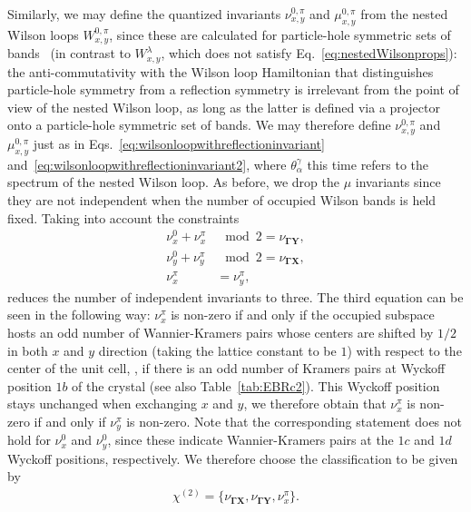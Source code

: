 Similarly, we may define the quantized invariants $\nu_{x,y}^{0,\pi}$ and $\mu_{x,y}^{0,\pi}$ from the nested Wilson loops $W_{x,y}^{0,\pi}$, since these are calculated for particle-hole symmetric sets of bands~\cite{BenMoTe2,wieder2018axion} (in contrast to $W_{x,y}^{\lambda}$, which does not satisfy Eq.~\eqref{eq:nestedWilsonprops}): the anti-commutativity with the Wilson loop Hamiltonian that distinguishes particle-hole symmetry from a reflection symmetry is irrelevant from the point of view of the nested Wilson loop, as long as the latter is defined via a projector onto a particle-hole symmetric set of bands. We may therefore define $\nu_{x,y}^{0,\pi}$ and $\mu_{x,y}^{0,\pi}$ just as in Eqs.~\eqref{eq:wilsonloopwithreflectioninvariant} and~\eqref{eq:wilsonloopwithreflectioninvariant2}, where $\theta_\alpha^\gamma$ this time refers to the spectrum of the nested Wilson loop. As before, we drop the $\mu$ invariants since they are not independent when the number of occupied Wilson bands is held fixed. Taking into account the constraints~\cite{Sander2DTCI2019} 
\begin{equation}
\begin{aligned}
\nu_{x}^{0} + \nu_{x}^{\pi} & \mod 2 = \nu_{\mathbf{\Gamma Y}}, \\
\nu_{y}^{0} + \nu_{y}^{\pi} & \mod 2 = \nu_{\mathbf{\Gamma X}}, \\
\nu_{x}^{\pi} &= \nu_{y}^{\pi},
\end{aligned}
\end{equation}
reduces the number of independent invariants to three. The third equation can be seen in the following way: $\nu_{x}^{\pi}$ is non-zero if and only if the occupied subspace hosts an odd number of Wannier-Kramers pairs whose centers are shifted by $1/2$ in both $x$ and $y$ direction (taking the lattice constant to be $1$) with respect to the center of the unit cell, \ie, if there is an odd number of Kramers pairs at Wyckoff position $1b$ of the crystal (see also Table~\ref{tab:EBRc2}). This Wyckoff position stays unchanged when exchanging $x$ and $y$, we therefore obtain that $\nu_{x}^{\pi}$ is non-zero if and only if $\nu_{y}^{\pi}$ is non-zero. Note that the corresponding statement does not hold for $\nu_{x}^{0}$ and $\nu_{y}^{0}$, since these indicate Wannier-Kramers pairs at the $1c$ and $1d$ Wyckoff positions, respectively. We therefore choose the classification to be given by
\begin{equation} 
\begin{aligned}
\chi^{(2)} = \{\nu_{\mathbf{\Gamma X}},\nu_{\mathbf{\Gamma Y}}, \nu_{x}^{\pi}\}.
 \end{aligned} 
 \label{eq:c2classificationWithoutInversion}
 \end{equation}

